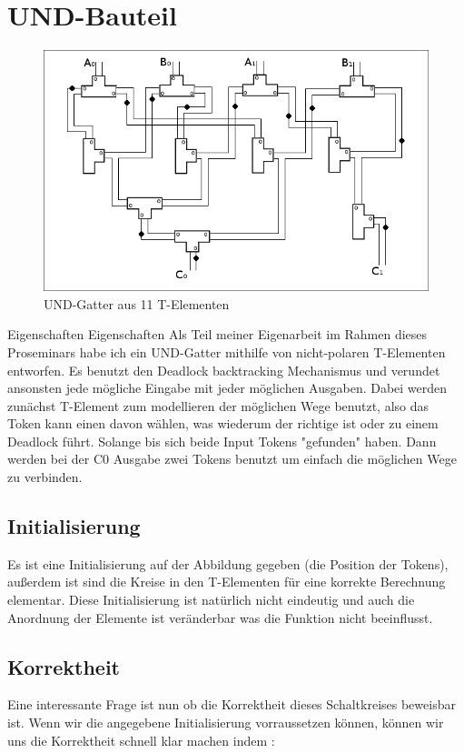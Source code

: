 \documentclass[11pt,a4paper]{article}
\begin{document}
\section{UND-Bauteil}

\begin{figure}[h]
    \centering
    \includegraphics[width=12cm]{bilder/UndGatter.png}
    \caption{UND-Gatter aus 11 T-Elementen}
\end{figure}    

Eigenschaften Eigenschaften
Als Teil meiner Eigenarbeit im Rahmen dieses Proseminars habe ich ein UND-Gatter
mithilfe von nicht-polaren T-Elementen entworfen.
%
Es benutzt den Deadlock backtracking Mechanismus und verundet ansonsten jede 
mögliche Eingabe mit jeder möglichen Ausgaben. 
%
Dabei werden zunächst T-Element zum modellieren der möglichen Wege benutzt,
also das Token kann einen davon wählen, was wiederum der richtige ist
oder zu einem Deadlock führt.
%
Solange bis sich beide Input Tokens "gefunden" haben.
%
Dann werden bei der C0 Ausgabe zwei Tokens benutzt um einfach die
möglichen Wege zu verbinden.


\subsection{Initialisierung}
Es ist eine Initialisierung auf der Abbildung gegeben (die Position der Tokens), 
außerdem ist sind die Kreise in den T-Elementen für eine korrekte Berechnung
elementar.
%
Diese Initialisierung ist natürlich nicht eindeutig und auch die Anordnung der
Elemente ist veränderbar was die Funktion nicht beeinflusst.

\subsection{Korrektheit}
Eine interessante Frage ist nun ob die Korrektheit dieses Schaltkreises
beweisbar ist. Wenn wir die angegebene Initialisierung vorraussetzen können,
können wir uns die Korrektheit schnell klar machen indem :
\end{document}
